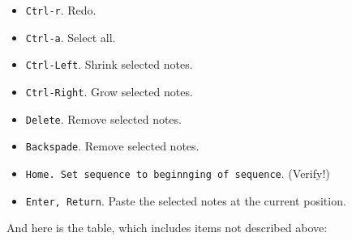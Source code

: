    \begin{itemize}
      \item \texttt{Ctrl-r}. Redo.
      \item \texttt{Ctrl-a}. Select all.
      \item \texttt{Ctrl-Left}.  Shrink selected notes.
      \item \texttt{Ctrl-Right}.  Grow selected notes.
      \item \texttt{Delete}.  Remove selected notes.
      \item \texttt{Backspade}.  Remove selected notes.
      \item \texttt{Home.  Set sequence to beginnging of sequence}.  (Verify!)
      \item \texttt{Enter, Return}.
         Paste the selected notes at the current position.
   \end{itemize}

   And here is the table, which includes items not described above:

